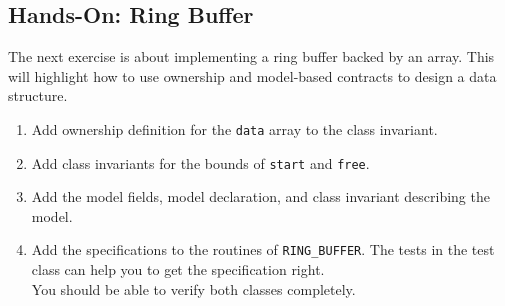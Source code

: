 \documentclass[a4paper,12pt]{article}
\newcommand{\e}[1]{\mbox{\lstinline[language=Eiffel]|#1|}}
\begin{document}
\subsection{Hands-On: Ring Buffer}

The next exercise is about implementing a ring buffer backed by an array. This will highlight how to use ownership and model-based contracts to design a data structure.

\begin{enumerate}[label=\bfseries Task \arabic*:, leftmargin=1.8cm]
\item Add ownership definition for the \e{data} array to the class invariant.
\item Add class invariants for the bounds of \e{start} and \e{free}.
\item Add the model fields, model declaration, and class invariant describing the model.
\item Add the specifications to the routines of \e{RING_BUFFER}. The tests in the test class can help you to get the specification right. \\
      You should be able to verify both classes completely.
\end{enumerate}






\end{document}
